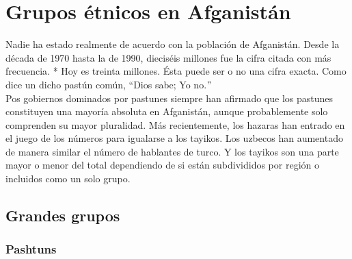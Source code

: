 \documentclass[10pt]{book}
\begin{document}
\section{Grupos étnicos en Afganistán}
Nadie ha estado realmente de acuerdo con la población de Afganistán. Desde la década de 1970 hasta la de 1990, dieciséis millones fue la cifra citada con más frecuencia. * Hoy es treinta millones. Ésta puede ser o no una cifra exacta. Como dice un dicho pastún común, $“$Dios sabe; Yo no.$"$\\
Pos gobiernos dominados por pastunes siempre han afirmado que los pastunes constituyen una mayoría absoluta en Afganistán, aunque probablemente solo comprenden su mayor pluralidad. Más recientemente, los hazaras han entrado en el juego de los números para igualarse a los tayikos. Los uzbecos han aumentado de manera similar el número de hablantes de turco. Y los tayikos son una parte mayor o menor del total dependiendo de si están subdivididos por región o incluidos como un solo grupo.\\
\subsection{Grandes grupos}
\subsubsection*{Pashtuns}
\end{document}
